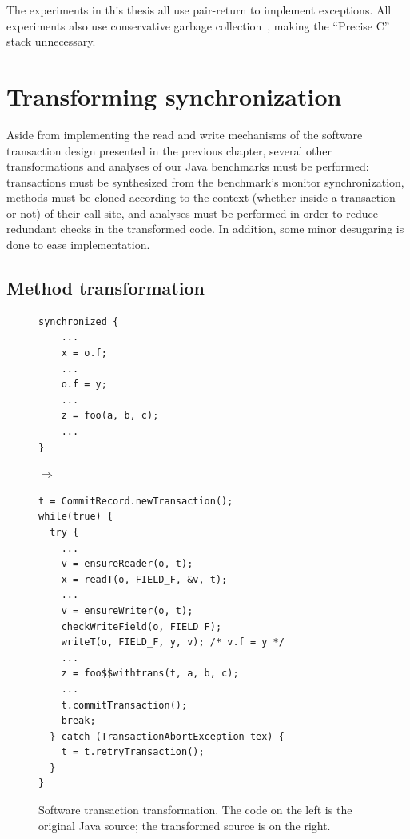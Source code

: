 The experiments in this thesis all use pair-return to implement
exceptions.  All experiments also use conservative garbage
collection~\cite{BoehmDeWe91}, making the ``Precise C'' stack unnecessary.

\section{Transforming synchronization}\label{sec:synctrans}
Aside from implementing the read and write mechanisms of the software
transaction design presented in the previous chapter, several
other transformations and analyses of our Java benchmarks must be
performed: transactions must be synthesized from the benchmark's
monitor synchronization, methods must be cloned according to the
context (whether inside a transaction or not) of their call site,
and analyses must be performed in order to reduce redundant checks in the
transformed code.  In addition, some minor desugaring is done to ease
implementation.

\subsection{Method transformation}
\begin{figure}\sis\fontsize{9}{10}
\begin{minipage}{1.5in}
\begin{verbatim}
synchronized {
    ...
    x = o.f;
    ...
    o.f = y;
    ...
    z = foo(a, b, c);
    ...
}
\end{verbatim}
\end{minipage}
$\Rightarrow\quad$
\begin{minipage}{3in}
\begin{verbatim}
t = CommitRecord.newTransaction();
while(true) {
  try {
    ...
    v = ensureReader(o, t);
    x = readT(o, FIELD_F, &v, t);
    ...
    v = ensureWriter(o, t);
    checkWriteField(o, FIELD_F);
    writeT(o, FIELD_F, y, v); /* v.f = y */
    ...
    z = foo$$withtrans(t, a, b, c);
    ...
    t.commitTransaction();
    break;
  } catch (TransactionAbortException tex) {
    t = t.retryTransaction();
  }
}
\end{verbatim}
\end{minipage}
\caption[Software transaction transformation.]
{Software transaction transformation.  The code on the left is the
  original Java source; the transformed source is on the right.}
\label{fig:synctrans}\end{figure}

